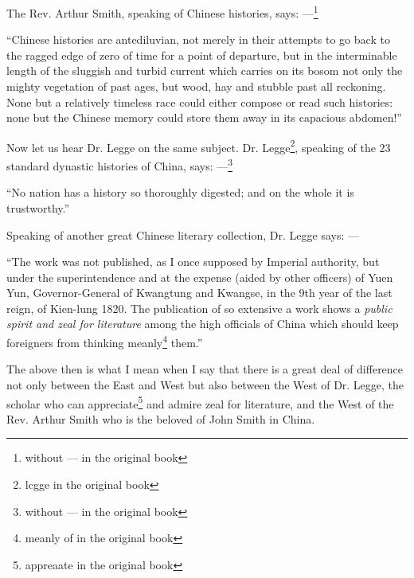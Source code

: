 The Rev. Arthur Smith, speaking of Chinese histories, says: ---\footnote{without --- in the original book}

``Chinese histories are antediluvian, not merely in their attempts to go back to the ragged edge of zero of time for a point of departure, but in the interminable length of the sluggish and turbid current which carries on its bosom not only the mighty vegetation of past ages, but wood, hay and stubble past all reckoning. None but a relatively timeless race could either compose or read such histories: none but the Chinese memory could store them away in its capacious abdomen!''

Now let us hear Dr. Legge on the same subject.
Dr. Legge\footnote{lcgge in the original book}, speaking of the 23 standard dynastic histories of China, says: ---\footnote{without --- in the original book}

``No nation has a history so thoroughly digested; and on the whole it is trustworthy.''

Speaking of another great Chinese literary collection, Dr. Legge says: --- 

``The work was not published, as I once supposed by Imperial authority, but under the superintendence and at the expense (aided by other officers) of Yuen Yun, Governor-General of Kwangtung and Kwangse, in the 9th year of the last reign, of Kien-lung 1820.
The publication of so extensive a work shows a \emph{public spirit and zeal for literature} among the high officials of China which should keep foreigners from thinking meanly\footnote{meanly of in the original book} them.''

The above then is what I mean when I say that there is a great deal of difference not only between the East and West but also between the West of Dr. Legge, the scholar who can appreciate\footnote{appreaate in the original book} and admire zeal for literature, and the West of the Rev. Arthur Smith who is the beloved of John Smith in China.
